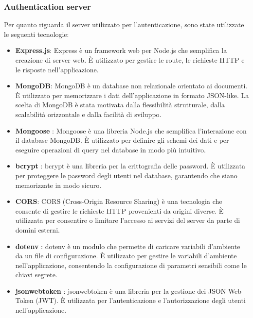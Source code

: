 \subsubsection{Authentication server}

Per quanto riguarda il server utilizzato per l'autenticazione, sono state utilizzate le seguenti tecnologie:

\begin{itemize}
      \item \textbf{Express.js}: Express è un framework web per Node.js che semplifica
            la creazione di server web. È utilizzato per gestire le route, le richieste HTTP e
            le risposte nell'applicazione.

      \item \textbf{MongoDB}: MongoDB è un database non relazionale orientato ai documenti.
            È utilizzato per memorizzare i dati dell'applicazione in formato JSON-like. La scelta di
            MongoDB è stata motivata dalla flessibilità strutturale, dalla scalabilità orizzontale e
            dalla facilità di sviluppo.

      \item \textbf{Mongoose} \cite{mongoose}: Mongoose è una libreria Node.js che semplifica l'interazione con
            il database MongoDB. È utilizzato per definire gli schemi dei dati e per eseguire operazioni
            di query nel database in modo più intuitivo.

      \item \textbf{bcrypt} \cite{bcrypt}: bcrypt è una libreria per la crittografia delle password. È utilizzata
            per proteggere le password degli utenti nel database, garantendo che siano memorizzate in modo sicuro.

      \item \textbf{CORS}: CORS (Cross-Origin Resource Sharing) è una tecnologia che consente di
            gestire le richieste HTTP provenienti da origini diverse. È utilizzata per consentire o
            limitare l'accesso ai servizi del server da parte di domini esterni.

      \item \textbf{dotenv} \cite{dotenv}: dotenv è un modulo che permette di caricare variabili d'ambiente da
            un file di configurazione. È utilizzato per gestire le variabili d'ambiente nell'applicazione,
            consentendo la configurazione di parametri sensibili come le chiavi segrete.

      \item \textbf{jsonwebtoken} \cite{jsonwebtoken}: jsonwebtoken è una libreria per la gestione dei JSON Web Token (JWT).
            È utilizzata per l'autenticazione e l'autorizzazione degli utenti nell'applicazione.
\end{itemize}

